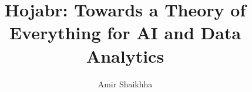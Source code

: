 \documentclass[sigconf,nonacm]{acmart}
\begin{document}
\title{Hojabr: Towards a Theory of Everything for AI and Data Analytics}

\author{Amir Shaikhha}



\newcommand{\smartpara}[1]{\noindent \textbf{#1.}}

\newcommand{\RA}[1]{{\color[HTML]{0088AA}{#1}}}
\newcommand{\RB}[1]{{\color[HTML]{AA4499}{#1}}}
\newcommand{\RC}[1]{{\color[HTML]{D55E00}{#1}}}
\newcommand{\RAll}[1]{{\color[HTML]{117733}{#1}}}





\newcommand{\lang}{Hojabr\xspace}

\newcommand{\amirsh}[1]{{\color{red}Amir: #1}}
\newcommand{\todo}[1]{{\color{red}TODO: #1}}

\newcommand{\changed}[1]{{\color{blue}#1}}

\newcommand{\codekwstyle}{\ttfamily\bfseries\color{myblue}}
\newcommand{\codemcstyle}{\ttfamily\bfseries\color{mygreen}}

\newcommand{\code}[1]{{\texttt{#1}}}
\newcommand{\codekw}[1]{{\codekwstyle\texttt{#1}}}
\newcommand{\codemc}[1]{{\codemcstyle\texttt{#1}}}
\newcommand{\codetiny}[1]{{\footnotesize\ttfamily\texttt{#1}}}
\newcommand{\codekwpy}[1]{{\footnotesize\color{blue}#1}}

\newcommand{\ruleaction}{$\lhd$}
\end{document}

